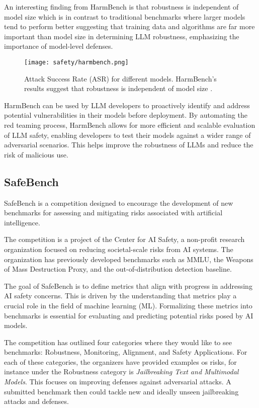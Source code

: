 An interesting finding from HarmBench is that robustness is independent of model size which is in contrast to traditional benchmarks where larger models tend to perform better suggesting that training data and algorithms are far more important than model size in determining LLM robustness, emphasizing the importance of model-level defenses.

\begin{figure}[H]
\centering
\texttt{[image: safety/harmbench.png]}
\caption{Attack Success Rate (ASR) for different models. HarmBench's results suggest that robustness is independent of model size \cite{mazeika2024harmbenchstandardizedevaluationframework}.}
\label{fig:harmbench}
\end{figure}

HarmBench can be used by LLM developers to proactively identify and address potential vulnerabilities in their models before deployment. By automating the red teaming process, HarmBench allows for more efficient and scalable evaluation of LLM safety, enabling developers to test their models against a wider range of adversarial scenarios. This helps improve the robustness of LLMs and reduce the risk of malicious use.

\subsection{SafeBench}

SafeBench  is a competition designed to encourage the development of new benchmarks for assessing and mitigating risks associated with artificial intelligence.

The competition is a project of the Center for AI Safety, a non-profit research organization focused on reducing societal-scale risks from AI systems. The organization has previously developed benchmarks such as MMLU, the Weapons of Mass Destruction Proxy, and the out-of-distribution detection baseline.

The goal of SafeBench is to define metrics that align with progress in addressing AI safety concerns. This is driven by the understanding that metrics play a crucial role in the field of machine learning (ML). Formalizing these metrics into benchmarks is essential for evaluating and predicting potential risks posed by AI models.

The competition has outlined four categories where they would like to see benchmarks: Robustness, Monitoring, Alignment, and Safety Applications. For each of these categories, the organizers have provided examples os risks, for instance under the Robustness category is \textit{Jailbreaking Text and Multimodal Models}. This focuses on improving defenses against adversarial attacks. A submitted benchmark then could tackle new and ideally unseen jailbreaking attacks and defenses.

